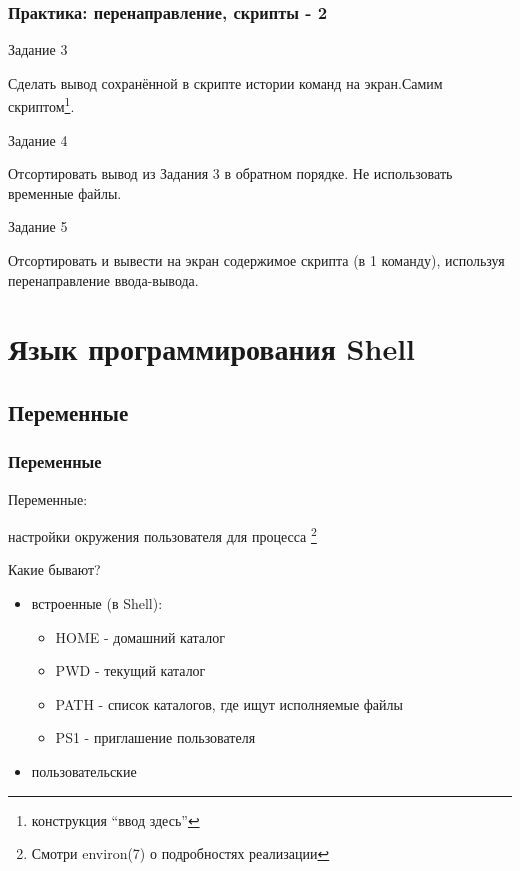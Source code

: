 \begin{frame}
  \frametitle{Практика: перенаправление, скрипты - 2}

  \alert{Задание 3}
  
  Сделать вывод сохранённой в скрипте истории команд на экран.\newline Самим скриптом\footnote{конструкция ``ввод здесь''}.

  \pause

  \alert{Задание 4}

  Отсортировать вывод из \alert{Задания 3} в обратном порядке. \newline Не использовать временные файлы.
  
  \pause

  \alert{Задание 5} 

  Отсортировать и вывести на экран содержимое скрипта (в 1 команду), используя перенаправление ввода-вывода.


\end{frame}

\section{Язык программирования Shell}

\subsection{Переменные}

\begin{frame}[fragile]
  \frametitle{Переменные}

  \Large{\alert{Переменные:}}
  
  \normalsize{настройки окружения пользователя для процесса}
  \footnote{Смотри environ(7) о подробностях реализации} \newline

  \pause 

  \Large{\alert{Какие бывают?}}
  \normalsize{ }
  \begin{itemize}
    \item встроенные (в Shell): 
      \begin{itemize}
	\item HOME - домашний каталог
	\item PWD - текущий каталог
	\item PATH - список каталогов, где ищут исполняемые файлы
	\item PS1 - приглашение пользователя
      \end{itemize}
    \item пользовательские 
  \end{itemize} 

\end{frame}

